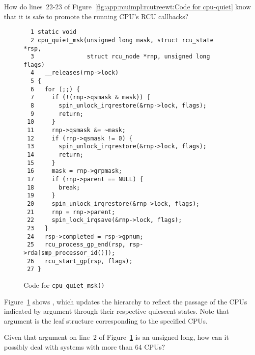 \QuickQuiz{}
	How do lines~22-23 of
	Figure~\ref{fig:app:rcuimpl:rcutreewt:Code for cpu-quiet}
	know that it is safe to promote the running CPU's RCU
	callbacks?
 \QuickQuizEnd

\begin{figure}[tbp]
{ \scriptsize
\begin{verbatim}
  1 static void
  2 cpu_quiet_msk(unsigned long mask, struct rcu_state *rsp,
  3               struct rcu_node *rnp, unsigned long flags)
  4   __releases(rnp->lock)
  5 {
  6   for (;;) {
  7     if (!(rnp->qsmask & mask)) {
  8       spin_unlock_irqrestore(&rnp->lock, flags);
  9       return;
 10     }
 11     rnp->qsmask &= ~mask;
 12     if (rnp->qsmask != 0) {
 13       spin_unlock_irqrestore(&rnp->lock, flags);
 14       return;
 15     }
 16     mask = rnp->grpmask;
 17     if (rnp->parent == NULL) {
 18       break;
 19     }
 20     spin_unlock_irqrestore(&rnp->lock, flags);
 21     rnp = rnp->parent;
 22     spin_lock_irqsave(&rnp->lock, flags);
 23   }
 24   rsp->completed = rsp->gpnum;
 25   rcu_process_gp_end(rsp, rsp->rda[smp_processor_id()]);
 26   rcu_start_gp(rsp, flags);
 27 }
\end{verbatim}
}
\caption{Code for {\tt cpu\_quiet\_msk()}}
\label{fig:app:rcuimpl:rcutreewt:Code for cpu-quiet-msk}
\end{figure}

Figure~\ref{fig:app:rcuimpl:rcutreewt:Code for cpu-quiet-msk}
shows , which updates the 
hierarchy to reflect the passage of the CPUs indicated by
argument  through their respective quiescent states.
Note that argument  is the leaf  structure
corresponding to the specified CPUs.

\QuickQuiz{}
	Given that argument  on line~2 of
	Figure~\ref{fig:app:rcuimpl:rcutreewt:Code for cpu-quiet-msk}
	is an unsigned long, how can it possibly deal with systems
	with more than 64 CPUs?
 \QuickQuizEnd

